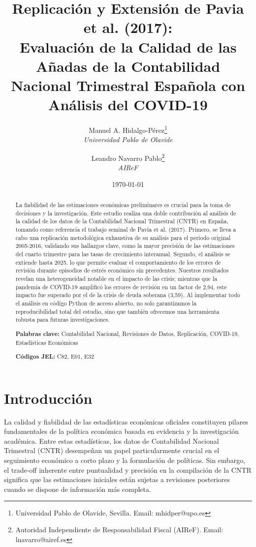 \documentclass{article}
\title{\textbf{Replicación y Extensión de Pavia et al. (2017): \\Evaluación de la Calidad de las Añadas de la Contabilidad Nacional Trimestral Española con Análisis del COVID-19}}
\author{
    Manuel A. Hidalgo-Pérez\thanks{Universidad Pablo de Olavide, Sevilla. Email: mhidper@upo.es} \\ 
    \textit{Universidad Pablo de Olavide} \\[0.5em]
    \and
    Leandro Navarro Pablo\thanks{Autoridad Independiente de Responsabilidad Fiscal (AIReF). Email: lnavarro@airef.es} \\
    \textit{AIReF}
}
\date{\today}
\begin{document}
\maketitle

\begin{abstract}
\noindent La fiabilidad de las estimaciones económicas preliminares es crucial para la toma de decisiones y la investigación. Este estudio realiza una doble contribución al análisis de la calidad de los datos de la Contabilidad Nacional Trimestral (CNTR) en España, tomando como referencia el trabajo seminal de Pavia et al. (2017). Primero, se lleva a cabo una replicación metodológica exhaustiva de su análisis para el período original 2005-2016, validando sus hallazgos clave, como la mayor precisión de las estimaciones del cuarto trimestre para las tasas de crecimiento interanual. Segundo, el análisis se extiende hasta 2025, lo que permite evaluar el comportamiento de los errores de revisión durante episodios de estrés económico sin precedentes. Nuestros resultados revelan una heterogeneidad notable en el impacto de las crisis; mientras que la pandemia de COVID-19 amplificó los errores de revisión en un factor de 2,94, este impacto fue superado por el de la crisis de deuda soberana (3,59). Al implementar todo el análisis en código Python de acceso abierto, no solo garantizamos la reproducibilidad total del estudio, sino que también ofrecemos una herramienta robusta para futuras investigaciones.

\noindent \textbf{Palabras clave:} Contabilidad Nacional, Revisiones de Datos, Replicación, COVID-19, Estadísticas Económicas

\noindent \textbf{Códigos JEL:} C82, E01, E32
\end{abstract}

\newpage

\section{Introducción}

La calidad y fiabilidad de las estadísticas económicas oficiales constituyen pilares fundamentales de la política económica basada en evidencia y la investigación académica. Entre estas estadísticas, los datos de Contabilidad Nacional Trimestral (CNTR) desempeñan un papel particularmente crucial en el seguimiento económico a corto plazo y la formulación de políticas. Sin embargo, el trade-off inherente entre puntualidad y precisión en la compilación de la CNTR significa que las estimaciones iniciales están sujetas a revisiones posteriores cuando se dispone de información más completa.
\end{document}
